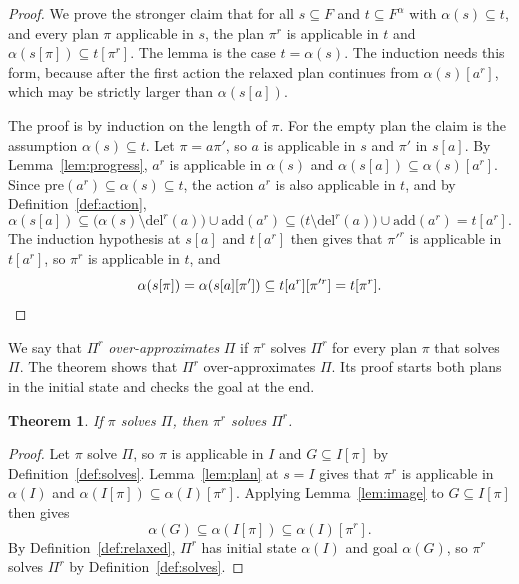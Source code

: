 \documentclass{article}
\theoremstyle{definition}
\theoremstyle{plain}
\newtheorem{theorem}{Theorem}
\theoremstyle{definition}
\begin{document}
\begin{proof}
We prove the stronger claim that for all $s \subseteq F$ and $t \subseteq F^\alpha$ with $\alpha(s) \subseteq t$, and every plan $\pi$ applicable in $s$, the plan $\pi^r$ is applicable in $t$ and $\alpha(s[\pi]) \subseteq t[\pi^r]$. The lemma is the case $t = \alpha(s)$. The induction needs this form, because after the first action the relaxed plan continues from $\alpha(s)[a^r]$, which may be strictly larger than $\alpha(s[a])$.

The proof is by induction on the length of $\pi$. For the empty plan the claim is the assumption $\alpha(s) \subseteq t$. Let $\pi = a\pi'$, so $a$ is applicable in $s$ and $\pi'$ in $s[a]$. By Lemma~\ref{lem:progress}, $a^r$ is applicable in $\alpha(s)$ and $\alpha(s[a]) \subseteq \alpha(s)[a^r]$. Since $\mathrm{pre}(a^r) \subseteq \alpha(s) \subseteq t$, the action $a^r$ is also applicable in $t$, and by Definition~\ref{def:action},
\[
  \alpha(s[a]) \subseteq \bigl(\alpha(s) \setminus \mathrm{del}^r(a)\bigr) \cup \mathrm{add}(a^r)
           \subseteq \bigl(t \setminus \mathrm{del}^r(a)\bigr) \cup \mathrm{add}(a^r) = t[a^r].
\]
The induction hypothesis at $s[a]$ and $t[a^r]$ then gives that $\pi'^r$ is applicable in $t[a^r]$, so $\pi^r$ is applicable in $t$, and
\[
  \alpha(s[\pi]) = \alpha(s[a][\pi']) \subseteq t[a^r][\pi'^r] = t[\pi^r]. \qedhere
\]
\end{proof}

We say that $\Pi^r$ \emph{over-approximates} $\Pi$ if $\pi^r$ solves $\Pi^r$ for every plan $\pi$ that solves $\Pi$. The theorem shows that $\Pi^r$ over-approximates $\Pi$. Its proof starts both plans in the initial state and checks the goal at the end.

\begin{theorem}
If $\pi$ solves $\Pi$, then $\pi^r$ solves $\Pi^r$.
\end{theorem}

\begin{proof}
Let $\pi$ solve $\Pi$, so $\pi$ is applicable in $I$ and $G \subseteq I[\pi]$ by Definition~\ref{def:solves}. Lemma~\ref{lem:plan} at $s = I$ gives that $\pi^r$ is applicable in $\alpha(I)$ and $\alpha(I[\pi]) \subseteq \alpha(I)[\pi^r]$. Applying Lemma~\ref{lem:image} to $G \subseteq I[\pi]$ then gives
\[
  \alpha(G) \subseteq \alpha(I[\pi]) \subseteq \alpha(I)[\pi^r].
\]
By Definition~\ref{def:relaxed}, $\Pi^r$ has initial state $\alpha(I)$ and goal $\alpha(G)$, so $\pi^r$ solves $\Pi^r$ by Definition~\ref{def:solves}.
\end{proof}
\end{document}
